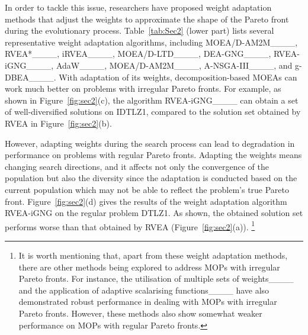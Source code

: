 In order to tackle this issue, researchers have proposed weight adaptation methods that adjust the weights to approximate the shape of the Pareto front during the evolutionary process. Table~\ref{tab:Sec2} (lower part) lists several representative weight adaptation algorithms, including MOEA/D-AM2M____, RVEA*____, iRVEA____, MOEA/D-LTD____, DEA-GNG____, RVEA-iGNG____, AdaW____, MOEA/D-AM2M____, A-NSGA-III____, and g-DBEA____. 
With adaptation of its weights, decomposition-based MOEAs can work much better on problems with irregular Pareto fronts.
For example, 
as shown in Figure~\ref{fig:sec2}(c), 
the algorithm RVEA-iGNG____ can obtain a set of well-diversified solutions on IDTLZ1,
compared to the solution set obtained by RVEA in Figure~\ref{fig:sec2}(b).




However, adapting weights during the search process can lead to degradation in performance on problems with regular Pareto fronts. 
Adapting the weights means changing search directions, 
and it affects not only the convergence of the population but also the diversity since the adaptation is conducted based on the current population which may not be able to reflect the problem's true Pareto front.  
Figure~\ref{fig:sec2}(d) gives the results of the weight adaptation algorithm RVEA-iGNG on the regular problem DTLZ1. 
As shown, the obtained solution set performs worse than that obtained by RVEA (Figure~\ref{fig:sec2}(a)). \footnote{It is worth mentioning that, apart from these weight adaptation methods, there are other methods being explored to address MOPs with irregular Pareto fronts. For instance, the utilisation of multiple sets of weights____ and the application of adaptive scalarising functions____ have also demonstrated robust performance in dealing with MOPs with irregular Pareto fronts. However, these methods also show somewhat weaker performance on MOPs with regular Pareto fronts.}





